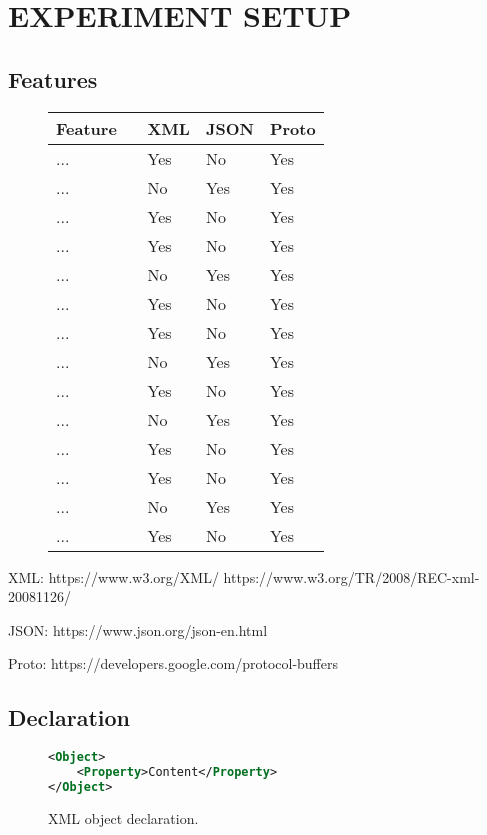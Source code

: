 \documentclass[../report.tex]{subfiles}
\begin{document}
\section{EXPERIMENT SETUP} %

\subsection{Features}

\begin{figure}[H]
\def\arraystretch{1.5}
\centering
\begin{tabular}{|p{0.35\linewidth}|p{0.1\linewidth}|p{0.1\linewidth}|p{0.1\linewidth}|}
\hline
Feature & XML & JSON & Proto \\
\hline
... & Yes & No & Yes \\ 
... & No & Yes & Yes \\ 
... & Yes & No & Yes \\ 
... & Yes & No & Yes \\ 
... & No & Yes & Yes \\ 
... & Yes & No & Yes \\ 
... & Yes & No & Yes \\ 
... & No & Yes & Yes \\ 
... & Yes & No & Yes \\ 
... & No & Yes & Yes \\ 
... & Yes & No & Yes \\ 
... & Yes & No & Yes \\ 
... & No & Yes & Yes \\ 
... & Yes & No & Yes \\ 
\hline
\end{tabular}
\end{figure}

XML: https://www.w3.org/XML/ https://www.w3.org/TR/2008/REC-xml-20081126/

JSON: https://www.json.org/json-en.html

Proto: https://developers.google.com/protocol-buffers

\subsection{Declaration}

\begin{figure}[H]
\begin{lstlisting}[language=XML, numbers=none]
<Object>
    <Property>Content</Property>
</Object>
\end{lstlisting}
\caption{XML object declaration.}
\end{figure}
\end{document}
